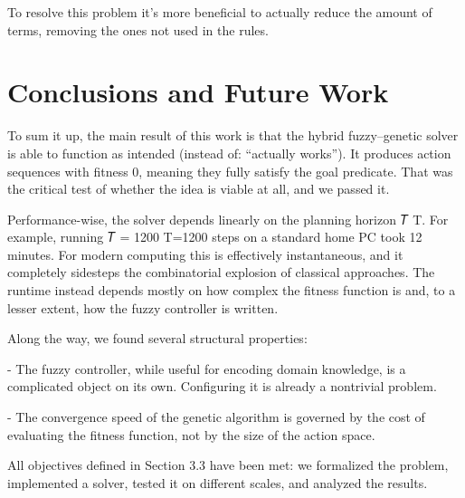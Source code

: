 \documentclass[12pt, a4paper]{report}
\begin{document}
	To resolve this problem it's more beneficial to actually reduce the amount of terms, removing the ones not used in the rules.
	


	
	\chapter{Conclusions and Future Work}\label{section::conclusions}


	
	To sum it up, the main result of this work is that the hybrid fuzzy–genetic solver is able to function as intended (instead of: “actually works”). It produces action sequences with fitness 0, meaning they fully satisfy the goal predicate. That was the critical test of whether the idea is viable at all, and we passed it.
	
	Performance-wise, the solver depends linearly on the planning horizon 
	𝑇
	T. For example, running 
	𝑇
	=
	1200
	T=1200 steps on a standard home PC took 12 minutes. For modern computing this is effectively instantaneous, and it completely sidesteps the combinatorial explosion of classical approaches. The runtime instead depends mostly on how complex the fitness function is and, to a lesser extent, how the fuzzy controller is written.
	
	Along the way, we found several structural properties:
	
	- The fuzzy controller, while useful for encoding domain knowledge, is a complicated object on its own. Configuring it is already a nontrivial problem.
	
	- The convergence speed of the genetic algorithm is governed by the cost of evaluating the fitness function, not by the size of the action space.
	
	All objectives defined in Section 3.3 have been met: we formalized the problem, implemented a solver, tested it on different scales, and analyzed the results.
	
\end{document}
